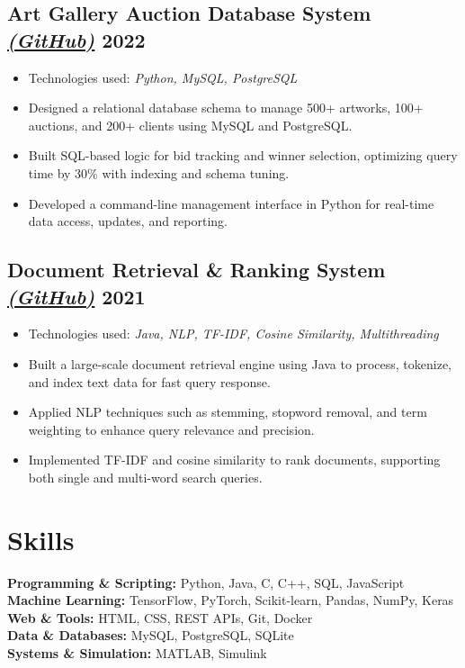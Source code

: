 \documentclass[a4,10pt]{article}
\newenvironment{zitemize}{
\begin{itemize}\itemsep0pt \parskip0pt \parsep1pt}
{\end{itemize}\vspace{-0.5cm}}
\begin{document}
\subsection*{\normalsize
\textbf{Art Gallery Auction Database System} 
\href{https://github.com/Erfanafshar/picto-db-system}{\normalfont\textit{(GitHub)}} 
\hfill 2022}
    \begin{zitemize}
        \item Technologies used: \textit{Python, MySQL, PostgreSQL}
        \item Designed a relational database schema to manage 500+ artworks, 100+ auctions, and 200+ clients using MySQL and PostgreSQL.
        \item Built SQL-based logic for bid tracking and winner selection, optimizing query time by 30\% with indexing and schema tuning.
        \item Developed a command-line management interface in Python for real-time data access, updates, and reporting.
    \end{zitemize}


\subsection*{\normalsize
\textbf{Document Retrieval \& Ranking System} 
\href{https://github.com/Erfanafshar/document-search-engine}{\normalfont\textit{(GitHub)}} 
\hfill 2021}
    \begin{zitemize}
        \item Technologies used: \textit{Java, NLP, TF-IDF, Cosine Similarity, Multithreading}
        \item Built a large-scale document retrieval engine using Java to process, tokenize, and index text data for fast query response.
        \item Applied NLP techniques such as stemming, stopword removal, and term weighting to enhance query relevance and precision.
        \item Implemented TF-IDF and cosine similarity to rank documents, supporting both single and multi-word search queries.
    \end{zitemize}



\section*{Skills}
\textbf{Programming \& Scripting:} Python, Java, C, C++, SQL, JavaScript \\
\textbf{Machine Learning:} TensorFlow, PyTorch, Scikit-learn, Pandas, NumPy, Keras \\
\textbf{Web \& Tools:} HTML, CSS, REST APIs, Git, Docker \\
\textbf{Data \& Databases:} MySQL, PostgreSQL, SQLite \\
\textbf{Systems \& Simulation:} MATLAB, Simulink
\end{document}
